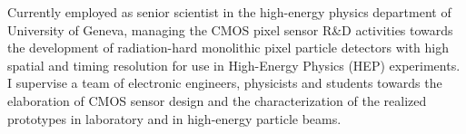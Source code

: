 

\begin{cvparagraph}

Currently employed as senior scientist in the high-energy physics department of University of Geneva, managing the CMOS pixel sensor R\&D activities towards the development of radiation-hard monolithic pixel particle detectors with high spatial and timing resolution for use in High-Energy Physics (HEP) experiments. I supervise a team of electronic engineers, physicists and students towards the elaboration of CMOS sensor design and the characterization of the realized prototypes in laboratory and in high-energy particle beams.

\end{cvparagraph}
